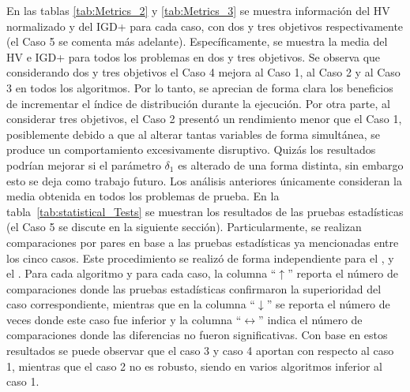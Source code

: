 En las tablas \ref{tab:Metrics_2} y \ref{tab:Metrics_3} se muestra información del HV normalizado \cite{zitzler1999multiobjective} y del IGD+ \cite{Joel:IGDPlus_And_GDPlus} para cada caso, con
dos y tres objetivos respectivamente (el Caso 5 se comenta más adelante).
%
Específicamente, se muestra la media del HV e IGD+ para todos los problemas en dos y tres objetivos.
%
Se observa que considerando dos y tres objetivos el Caso 4 mejora al Caso 1, al Caso 2 y al Caso 3 en todos los algoritmos.
%
Por lo tanto, se aprecian de forma clara los beneficios de incrementar el índice de distribución durante la ejecución.
%
Por otra parte, al considerar tres objetivos, el Caso 2 presentó un rendimiento menor que el Caso 1, 
posiblemente debido a que al alterar tantas variables de forma simultánea, se produce un comportamiento excesivamente disruptivo.
%
Quizás los resultados podrían mejorar si el parámetro $\delta_1$ es alterado de una forma distinta, sin embargo esto se deja como trabajo futuro.
%
Los análisis anteriores únicamente consideran la media obtenida en todos los problemas de prueba.
%
En la tabla~\ref{tab:statistical_Tests} se muestran los resultados de las pruebas estadísticas (el Caso 5 se discute en la siguiente sección).
%
Particularmente, se realizan comparaciones por pares en base a las pruebas estadísticas ya mencionadas entre los cinco casos.
%
Este procedimiento se realizó de forma independiente para el \NSGAII{}, \MOEAD{} y el \SMSEMOA{}.
%
Para cada algoritmo y para cada caso, la columna ``$\uparrow$'' reporta el número de comparaciones donde las pruebas estadísticas confirmaron 
la superioridad del caso correspondiente, mientras que en la columna ``$\downarrow$'' se reporta el número de veces donde este caso fue inferior 
y la columna ``$\longleftrightarrow$'' indica el número de comparaciones donde las diferencias no fueron significativas.
%
Con base en estos resultados se puede observar que el caso 3 y caso 4 aportan con respecto al caso 1, mientras que el caso 2 no es
robusto, siendo en varios algoritmos inferior al caso 1.
%
%
%
